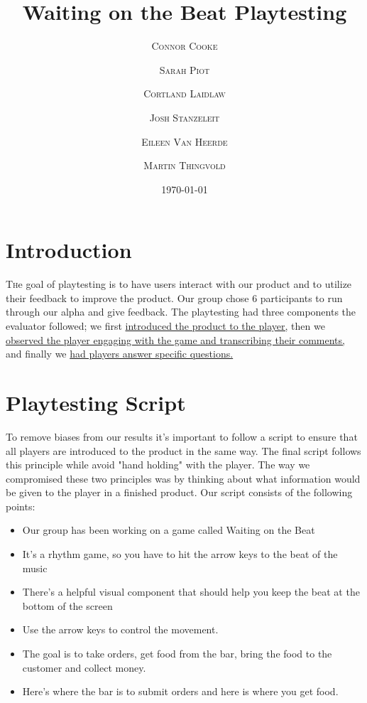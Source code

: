 \documentclass[twoside,twocolumn]{article}
\title{Waiting on the Beat Playtesting} %
\author{%
\textsc{Connor Cooke}
\and
\textsc{Sarah Piot}
\and
\textsc{Cortland Laidlaw}
\and
\textsc{Josh Stanzeleit}
\and
\textsc{Eileen Van Heerde}
\and
\textsc{Martin Thingvold}\\
}
\date{\today} %
\begin{document}
\maketitle


\section{Introduction}

\lettrine[nindent=0em,lines=3]{T} he goal of playtesting is to have users interact
with our product and to utilize their feedback to improve the product. Our group chose
6%
participants to run through our alpha and give feedback. The playtesting had three components the evaluator followed; we first \hyperlink{section.2}{introduced the product to the player,} then we \hyperlink{section.3}{observed the player engaging with the
game and transcribing their comments,} and finally we \hyperlink{section.4}{had players answer specific questions.}





\section{Playtesting Script}
\label{sec:script}
To remove biases from our results it's important to follow a script to ensure that all players are introduced
to the product in the same way. The final script follows this principle while avoid "hand holding" with the player.
The way we compromised these two principles was by thinking about what information would be given to the player in a finished product. Our script consists of the following points:

\begin{itemize}
\item Our group has been working on a game called Waiting on the Beat
\item It's a rhythm game, so you have to hit the arrow keys to the beat of the music
\item There's a helpful visual component that should help you keep the beat at the bottom of the screen
\item Use the arrow keys to control the movement.
\item The goal is to take orders, get food from the bar, bring the food to the customer and collect money.
\item Here's where the bar is to submit orders and here is where you get food.
\end{itemize}
\end{document}
